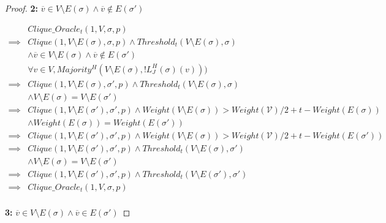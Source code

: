 \begin{proof}
  \textbf{2:} $\overline{v} \in V \setminus E(\sigma) \land \overline{v} \notin E(\sigma')$


  \begin{align}
    &Clique\_Oracle_t(1, V, \sigma, p) \\
    \implies& Clique(1, V \setminus E(\sigma), \sigma, p) \land Threshold_t(V \setminus E(\sigma), \sigma) \\
            & \land \overline{v} \in V \setminus E(\sigma) \land \overline{v} \notin E(\sigma') \\
            & \forall v \in V, Majority^H(V \setminus E(\sigma), !L^H_J(\sigma)(v))) \\
    \implies& Clique(1, V \setminus E(\sigma), \sigma', p) \land Threshold_t(V \setminus E(\sigma), \sigma) \\
            & \land V \setminus E(\sigma) = V \setminus E(\sigma') \\
    \implies& Clique(1, V \setminus E(\sigma'), \sigma', p) \land Weight(V \setminus E(\sigma)) > Weight(\mathcal{V})/2 + t - Weight(E(\sigma)) \\
            & \land Weight(E(\sigma)) = Weight(E(\sigma')) \\
    \implies& Clique(1, V \setminus E(\sigma'), \sigma', p) \land Weight(V \setminus E(\sigma)) > Weight(\mathcal{V})/2 + t - Weight(E(\sigma')) \\
    \implies& Clique(1, V \setminus E(\sigma'), \sigma', p) \land Threshold_t(V \setminus E(\sigma), \sigma') \\
            & \land V \setminus E(\sigma) = V \setminus E(\sigma') \\
    \implies& Clique(1, V \setminus E(\sigma'), \sigma', p) \land Threshold_t(V \setminus E(\sigma'), \sigma') \\
    \implies& Clique\_Oracle_t(1, V, \sigma, p) \\
  \end{align}

  \textbf{3:} $\overline{v} \in V \setminus E(\sigma) \land \overline{v} \in E(\sigma')$


\end{proof}
